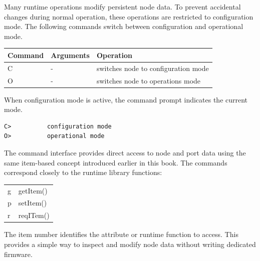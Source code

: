 
Many runtime operations modify persistent node data. To prevent accidental changes
during normal operation, these operations are restricted to configuration mode.
The following commands switch between configuration and operational mode.

\begin{table}[ht!]
    \begin{center}
        \renewcommand{\arraystretch}{1.2}
        \begin{tabularx}{0.8\textwidth}{|l|l|X|}
            \hline
            \textbf{Command} & \textbf{Arguments}  & \textbf{Operation} \\
            \hline
            C & - & switches node to configuration mode\\
            \hline
            O & - & switches node to operations mode\\
            \hline
        \end{tabularx}
    \end{center}
\end{table}
\FloatBarrier


When configuration mode is active, the command prompt indicates the current mode.

\lstset{style=codesnippet-nobox}
\begin{lstlisting}
C>          configuration mode
O>          operational mode
\end{lstlisting}


The command interface provides direct access to node and port data using the same
item-based concept introduced earlier in this book.
The commands correspond closely to the runtime library functions:

\begin{tabular}{ll}
g & getItem() \\
p & setItem() \\
r & reqITem()
\end{tabular}

The item number identifies the attribute or runtime function to access. This provides
a simple way to inspect and modify node data without writing dedicated firmware.

